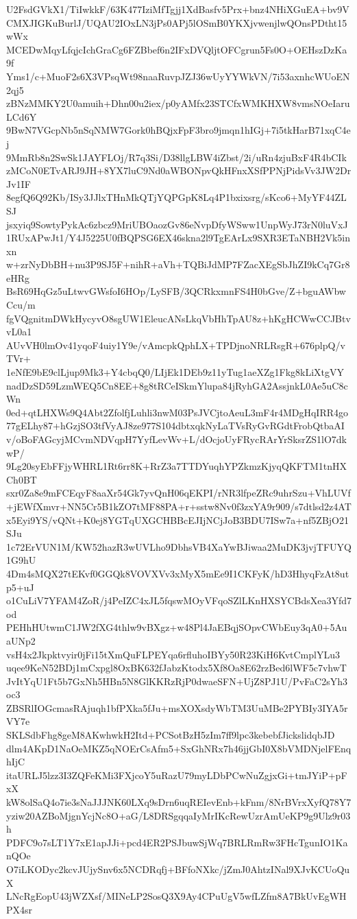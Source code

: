 U2FsdGVkX1/TiIwkkF/63K477IziMfTgjj1XdBasfv5Prx+bnz4NHiXGuEA+bv9V
CMXJIGKuBurlJ/UQAU2IOxLN3jPs0APj5lOSmB0YKXjvwenjlwQOnsPDtht15wWx
MCEDwMqyLfqjcIchGraCg6FZBbef6n2IFxDVQljtOFCgrun5Fs0O+OEHszDzKa9f
Yms1/c+MuoF2s6X3VPsqWt98naaRuvpJZJ36wUyYYWkVN/7i53axnhcWUoEN2qj5
zBNzMMKY2U0amuih+Dhn00u2iex/p0yAMfx23STCfxWMKHXW8vmsNOeIaruLCd6Y
9BwN7VGcpNb5nSqNMW7Gork0hBQjxFpF3bro9jmqn1hIGj+7i5tkHarB71xqC4ej
9MmRb8n2SwSk1JAYFLOj/R7q3Si/D38llgLBW4iZbst/2i/uRn4zjuBxF4R4bCIk
zMCoN0ETvARJ9JH+8YX7luC9Nd0aWBONpvQkHFnxXSfPPNjPidsVv3JW2DrJv1IF
8egfQ6Q92Kb/ISy3JJlxTHnMkQTjYQPGpK8Lq4P1bxixsrg/sKco6+MyYF44ZLSJ
jsxyiq9SowtyPykAc6zbcz9MriUBOaozGv86eNvpDfyWSww1UnpWyJ73rN0luVxJ
1RUxAPwJt1/Y4J5225U0fBQPSG6EX46skna2l9TgEArLx9SXR3ETaNBH2Vk5inxn
w+zrNyDbBH+nu3P9SJ5F+nihR+aVh+TQBiJdMP7FZacXEgSbJhZI9kCq7Gr8eHRg
BsR69HqGz5uLtwvGWsfoI6HOp/LySFB/3QCRkxmnFS4H0bGve/Z+bguAWbwCcu/m
fgVQgnitmDWkHycyvO8sgUW1EleucANsLkqVbHhTpAU8z+hKgHCWwCCJBtvvL0a1
AUvVH0lmOv41yqoF4uiy1Y9e/vAmcpkQphLX+TPDjnoNRLRsgR+676plpQ/vTVr+
1eNfE9bE9clLjup9Mk3+Y4cbqQ0/LIjEk1DEb9z11yTug1aeXZg1Fkg8kLiXtgVY
nadDzSD59LzmWEQ5Cn8EE+8g8tRCeISkmYlupa84jRyhGA2AssjnkL0Ae5uC8cWn
0ed+qtLHXWs9Q4Abt2ZfolfjLuhli3nwM03PsJVCjtoAeuL3mF4r4MDgHqIRR4go
77gELhy87+hGzjSO3tfVyAJ8ze977S104dbtxqkNyLaTVsRyGvRGdtFrobQtbaAI
v/oBoFAGcyjMCvmNDVqpH7YyfLevWv+L/dOcjoUyFRycRArYrSksrZS1lO7dkwP/
9Lg20syEbFFjyWHRL1Rt6rr8K+RrZ3a7TTDYuqhYPZkmzKjyqQKFTM1tnHXCh0BT
sxr0Za8e9mFCEqyF8aaXr54Gk7yvQnH06qEKPI/rNR3lfpeZRc9uhrSzu+VhLUVf
+jEWfXmvr+NN5Cr5B1kZO7tMF88PA+r+sstw8Nv0f3zxYA9r909/s7dtlsd2z4AT
x5Eyi9YS/vQNt+K0ej8YGTqUXGCHBBcEJIjNCjJoB3BDU7ISw7a+nf5ZBjO21SJu
1c72ErVUN1M/KW52hazR3wUVLho9DbhsVB4XaYwBJiwaa2MuDK3jvjTFUYQ1G9hU
4Dm4sMQX27tEKvf0GGQk8VOVXVv3xMyX5mEe9I1CKFyK/hD3HhyqFzAt8utp5+uJ
o1CuLiV7YFAM4ZoR/j4PeIZC4xJL5fqswMOyVFqoSZlLKnHXSYCBdsXea3Yfd7od
PEHhHUtwmC1JW2fXG4thlw9vBXgz+w48Pl4JaEBqjSOpvCWbEuy3qA0+5AuaUNp2
vsH4x2Jkpktvyir0jFi15tXmQuFLPEYqa6rfluhoIBYy50R23KiH6KvtCmplYLu3
uqee9KeN52BDj1mCxpgl8OxBK632fJabzKtodx5Xf8Oa8E62rzBed6lWF5c7vhwT
JvItYqU1Ft5b7GxNh5HBn5N8GlKKRzRjP0dwaeSFN+UjZ8PJ1U/PvFaC2sYh3oc3
ZBSRlIOGcmasRAjuqh1bfPXka5fJu+msXOXsdyWbTM3UuMBe2PYBIy3IYA5rVY7e
SKLSdbFhg8geM8AKwhwkH2Itd+PCSotBzH5zIm7ff9lpc3kebebfJickslidqbJD
dlm4AKpD1NaOeMKZ5qNOErCsAfm5+SxGhNRx7h46jjGbI0X8bVMDNjelFEnqhIjC
itaURLJ5lzz3I3ZQFeKMi3FXjcoY5uRazU79myLDbPCwNuZgjxGi+tmJYiP+pFxX
kW8olSaQ4o7ie3sNaJJJNK60LXq9sDrn6uqREIevEnb+kFnm/8NrBVrxXyfQ78Y7
yziw20AZBoMjgnYcjNc8O+aG/L8DRSgqqaIyMrIKcRewUzrAmUeKP9g9Ulz9r03h
PDFC9o7sLT1Y7xE1apJJi+pcd4ER2PSJbuwSjWq7BRLRmRw3FHcTgunIO1KanQOe
O7iLKODyc2kcvJUjySnv6x5NCDRqfj+BFfoNXkc/jZmJ0AhtzINal9XJvKCUoQuX
LNcRgEopU43jWZXsf/MINeLP2SosQ3X9Ay4CPuUgV5wfLZfm8A7BkUvEgWHPX4sr

